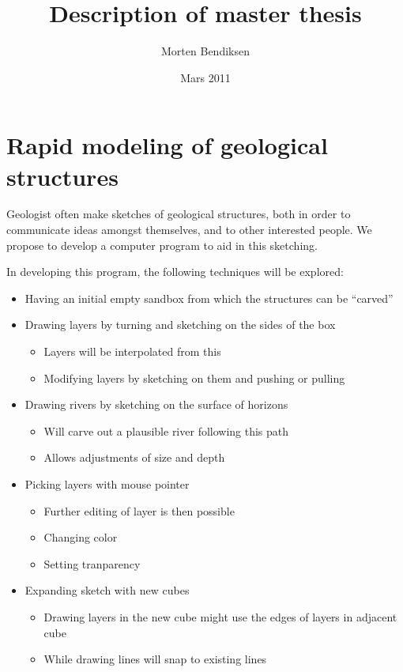 \documentclass[12pt,a4paper]{article}
\begin{document}
\title{Description of master thesis}
\author{Morten Bendiksen}
\date{Mars 2011}
\maketitle

\section*{Rapid modeling of geological structures}


Geologist often make sketches of geological structures, both in order to communicate ideas amongst themselves, and to other interested people. We propose to develop a computer program to aid in this sketching.

In developing this program, the following techniques will be explored:
\begin{itemize}
 \item Having an initial empty sandbox from which the structures can be ``carved''
 \item Drawing layers by turning and sketching on the sides of the box
    \begin{itemize}
     \item Layers will be interpolated from this
     \item Modifying layers by sketching on them and pushing or pulling
    \end{itemize}
 \item Drawing rivers by sketching on the surface of horizons
    \begin{itemize}
     \item Will carve out a plausible river following this path
     \item Allows adjustments of size and depth
    \end{itemize}
\item Picking layers with mouse pointer
    \begin{itemize}
     \item Further editing of layer is then possible
     \item Changing color
     \item Setting tranparency
    \end{itemize}
\item Expanding sketch with new cubes
    \begin{itemize}
     \item Drawing layers in the new cube might use the edges of layers in adjacent cube
     \item While drawing lines will snap to existing lines
    \end{itemize}
\end{itemize}
\end{document}
